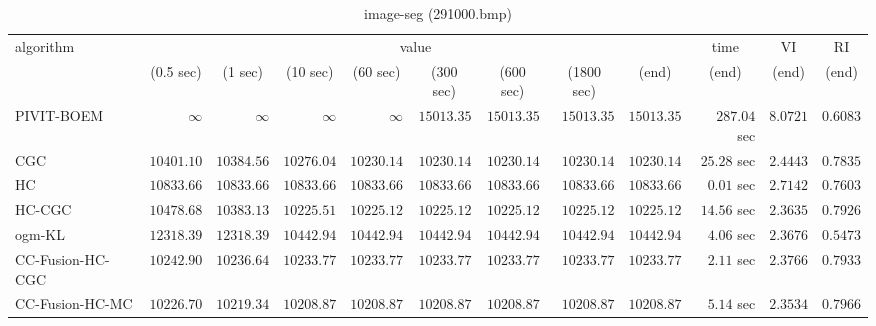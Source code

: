 \begin{table}[H]
\scriptsize
\centering
\caption{image-seg (291000.bmp)}
\label{tab:anytimetable-image-seg-291000.bmp}
\begin{tabular}{lrrrrrrrrrrr}
\toprule
           algorithm &                                   \multicolumn{8}{c}{value} & \multicolumn{1}{c}{time}    & \multicolumn{1}{c}{VI}  & \multicolumn{1}{c}{RI} \\  
\cmidrule(lr){2-9}\cmidrule(lr){10-10} \cmidrule(lr){11-11} \cmidrule(lr){12-12}   
                     & \multicolumn{1}{c}{(0.5 sec)} & \multicolumn{1}{c}{(1 sec)} & \multicolumn{1}{c}{(10 sec)} & \multicolumn{1}{c}{(60 sec)} & \multicolumn{1}{c}{(300 sec)} & \multicolumn{1}{c}{(600 sec)} & \multicolumn{1}{c}{(1800 sec)} & \multicolumn{1}{c}{(end)} & \multicolumn{1}{c}{(end)}    & \multicolumn{1}{c}{(end)}   & \multicolumn{1}{c}{(end)}  \\ \midrule 
          PIVIT-BOEM & $\infty$ & $\infty$ & $\infty$ & $\infty$ & $     15013.35$ & $     15013.35$ & $     15013.35$ & $     15013.35$ & $       287.04$ sec    & $       8.0721$  & $       0.6083$ \\ 
                 CGC & $     10401.10$ & $     10384.56$ & $     10276.04$ & $     10230.14$ & $     10230.14$ & $     10230.14$ & $     10230.14$ & $     10230.14$ & $        25.28$ sec    & $       2.4443$  & $       0.7835$ \\ 
                  HC & $     10833.66$ & $     10833.66$ & $     10833.66$ & $     10833.66$ & $     10833.66$ & $     10833.66$ & $     10833.66$ & $     10833.66$ & $         0.01$ sec    & $       2.7142$  & $       0.7603$ \\ 
              HC-CGC & $     10478.68$ & $     10383.13$ & $     10225.51$ & $     10225.12$ & $     10225.12$ & $     10225.12$ & $     10225.12$ & $     10225.12$ & $        14.56$ sec    & $       2.3635$  & $       0.7926$ \\ 
              ogm-KL & $     12318.39$ & $     12318.39$ & $     10442.94$ & $     10442.94$ & $     10442.94$ & $     10442.94$ & $     10442.94$ & $     10442.94$ & $         4.06$ sec    & $       2.3676$  & $       0.5473$ \\ 
    CC-Fusion-HC-CGC & $     10242.90$ & $     10236.64$ & $     10233.77$ & $     10233.77$ & $     10233.77$ & $     10233.77$ & $     10233.77$ & $     10233.77$ & $         2.11$ sec    & $       2.3766$  & $       0.7933$ \\ 
     CC-Fusion-HC-MC & $     10226.70$ & $     10219.34$ & $     10208.87$ & $     10208.87$ & $     10208.87$ & $     10208.87$ & $     10208.87$ & $     10208.87$ & $         5.14$ sec    & $       2.3534$  & $       0.7966$ \\ 

\end{tabular}
\end{table}
